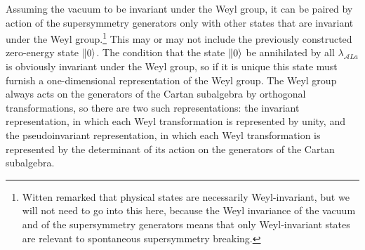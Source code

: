 Assuming the vacuum to be invariant under the Weyl group, it can be paired
by action of the supersymmetry generators only with other states that are
invariant under the Weyl group.\footnote{Witten remarked that physical
states are necessarily Weyl-invariant, but we will not need to go into this
here, because the Weyl invariance of the vacuum and of the supersymmetry
generators means that only Weyl-invariant states are relevant to spontaneous
supersymmetry breaking.} This may or may not include the previously
constructed zero-energy state \(\lVert 0\rangle\). The condition that the state
\(\lVert 0\rangle\) be annihilated by all \(\lambda_{\mathcal A La}\) is obviously
invariant under the Weyl group, so if it is unique this state must furnish a
one-dimensional representation of the Weyl group. The Weyl group always
acts on the generators of the Cartan subalgebra by orthogonal
transformations, so there are two such representations: the invariant
representation, in which each Weyl transformation is represented by unity,
and the pseudoinvariant representation, in which each Weyl transformation
is represented by the determinant of its action on the generators of the
Cartan subalgebra.

